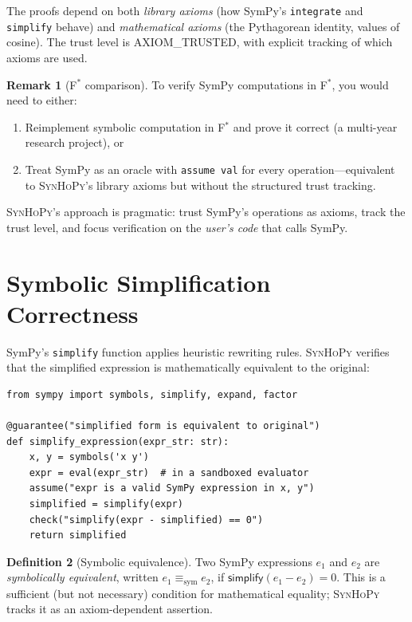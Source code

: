 \documentclass[11pt,a4paper]{report}
\theoremstyle{definition}
\newtheorem{definition}{Definition}[chapter]
\newtheorem{remark}[definition]{Remark}
\theoremstyle{plain}
\newcommand{\fstar}{F$^{*}$}
\newcommand{\synhopy}{\textsc{SynHoPy}}
\begin{document}
The proofs depend on both \emph{library axioms} (how SymPy's \texttt{integrate}
and \texttt{simplify} behave) and \emph{mathematical axioms} (the Pythagorean
identity, values of cosine). The trust level is \textsf{AXIOM\_TRUSTED}, with
explicit tracking of which axioms are used.

\begin{remark}[\fstar{} comparison]
To verify SymPy computations in \fstar{}, you would need to either:
\begin{enumerate}
  \item Reimplement symbolic computation in \fstar{} and prove it correct (a
    multi-year research project), or
  \item Treat SymPy as an oracle with \lstinline[style=fstar]{assume val} for
    every operation---equivalent to \synhopy{}'s library axioms but without
    the structured trust tracking.
\end{enumerate}
\synhopy{}'s approach is pragmatic: trust SymPy's operations as axioms, track
the trust level, and focus verification on the \emph{user's code} that calls
SymPy.
\end{remark}

\section{Symbolic Simplification Correctness}

SymPy's \texttt{simplify} function applies heuristic rewriting rules.
\synhopy{} verifies that the simplified expression is mathematically
equivalent to the original:

\begin{lstlisting}[style=synhopy]
from sympy import symbols, simplify, expand, factor

@guarantee("simplified form is equivalent to original")
def simplify_expression(expr_str: str):
    x, y = symbols('x y')
    expr = eval(expr_str)  # in a sandboxed evaluator
    assume("expr is a valid SymPy expression in x, y")
    simplified = simplify(expr)
    check("simplify(expr - simplified) == 0")
    return simplified
\end{lstlisting}

\begin{definition}[Symbolic equivalence]
Two SymPy expressions $e_1$ and $e_2$ are \emph{symbolically equivalent},
written $e_1 \equiv_{\mathrm{sym}} e_2$, if
$\mathsf{simplify}(e_1 - e_2) = 0$.  This is a sufficient (but not
necessary) condition for mathematical equality; \synhopy{} tracks it as
an axiom-dependent assertion.
\end{definition}
\end{document}
